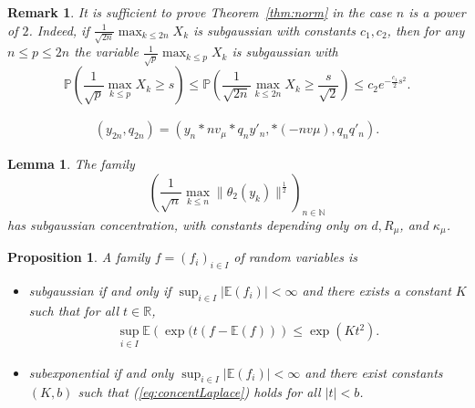 \documentclass[10pt,a4paper]{amsart}
\newtheorem{proposition}{Proposition}
\newtheorem{remark}{Remark}
\newtheorem{lemma}{Lemma}
\newcommand{\E}{\mathbb{E}}
\begin{document}
\begin{remark}\label{rk:power2}
It is sufficient to prove Theorem~\ref{thm:norm} in the case $n$ is a power of $2$. Indeed, if $\frac{1}{\sqrt{2n}}\max_{k\le 2n}X_k$ is subgaussian with constants $c_1,c_2$, then for any $n\le p \le 2n$ the variable $\frac{1}{\sqrt{p}}\max_{k\le p}X_k$ is subgaussian with
\[
\mathbb{P}\left(\frac{1}{\sqrt{p}}\max_{k\le p}X_k \ge s\right)\le 
\mathbb{P}\left(\frac{1}{\sqrt{2n}}\max_{k\le 2n}X_k \ge \frac{s}{\sqrt{2}}\right) \le c_2e^{-\frac{c_1}{2}s^2}.
\]
\end{remark}

\begin{align}\label{eq:y2n}
(y_{2n},q_{2n})=(y_n \ast nv_\mu\ast q_ny'_n,\ast(-nv\mu), q_nq'_n).
\end{align}

 \begin{lemma}\label{lem:theta2}
 The family
 \[
\left(  \frac{1}{\sqrt{n}} \max_{k\le n} \|\theta_2(y_k)\|^{\frac{1}{2}} \right)_{n \in \mathbb{N}}
 \]
 has subgaussian concentration, with constants depending only on $d,R_\mu$, and $\kappa_\mu$.
 \end{lemma}

\begin{proposition}\label{prop:SubexpSubGauss} A family $f=(f_{i})_{i\in I}$
of random variables is 
\begin{itemize}
\item subgaussian if and only if $\sup_{i\in I}|\E(f_{i})|<\infty$ and there exists a constant $K$ such that for all $t \in \mathbb{R}$,
\begin{align}\label{eq:concentLaplace}
\sup_{i\in I}\E\left(\exp(t(f-\E(f))\right)\leq\exp(Kt^{2}).
\end{align}
\item subexponential  if and
only $\sup_{i\in I}|\E(f_{i})|<\infty$ and there exist constants
$(K,b)$  such that (\ref{eq:concentLaplace}) holds  for all $|t|<b$.
\end{itemize}
\end{proposition} 
\end{document}
